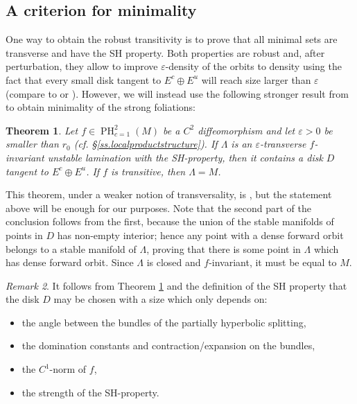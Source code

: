 \documentclass[a4paper,11pt]{amsart}
\numberwithin{equation}{section}     %
\newtheorem{teo}{Theorem}[section]
\theoremstyle{definition}
\theoremstyle{remark}
\newtheorem{obs}[teo]{Remark}
\newcommand{\eps}{\varepsilon}
\DeclareMathOperator{\PH}{PH}
\begin{document}
\subsection{A criterion for minimality}
One way to obtain the robust transitivity is to prove that all minimal sets are transverse and have the SH property. Both properties are robust and, after perturbation, they allow to improve $\eps$-density of the orbits to density using the fact that every small disk tangent to $E^{c} \oplus E^u$ will reach size larger than $\eps$ (compare to \cite[Theorem 1.2]{HT} or \cite[Proposition 5.14]{CroPot}). However, we will instead use the following stronger result from \cite{ACW} to obtain minimality of the strong foliations:

\begin{teo}
\label{teo-ACW} 
Let $f \in \PH^2_{c=1}(M)$ be a $C^2$ diffeomorphism and let $\eps>0$ be smaller than $r_0$ (cf. \S\ref{ss.localproductstructure}). If $\Lambda$ is an $\eps$-transverse $f$-invariant unstable lamination with the SH-property, then it contains a disk $D$ tangent to $E^c \oplus E^u$. If $f$ is transitive, then $\Lambda=M$. 
\end{teo}

This theorem, under a weaker notion of transversality, is \cite[Theorem C]{ACW}, but the statement above will be enough for our purposes. Note that the second part of the conclusion follows from the first, because the union of the stable manifolds of points in $D$ has non-empty interior; hence any point with a dense forward orbit belongs to a stable manifold of $\Lambda$, proving that there is some point in $\Lambda$ which has dense forward orbit. Since $\Lambda$ is closed and $f$-invariant, it must be equal to $M$. 

\begin{obs}\label{r.disk-uniform}
It follows from Theorem \ref{teo-ACW} and the definition of the SH property that
the disk $D$ may be chosen with a size which only depends on:
\begin{itemize}
\item the angle between the bundles of the partially hyperbolic splitting, 
\item the domination constants and contraction/expansion on the bundles,
\item the $C^1$-norm of $f$, 
\item the strength of the SH-property.
\end{itemize}
\end{obs}
\end{document}
